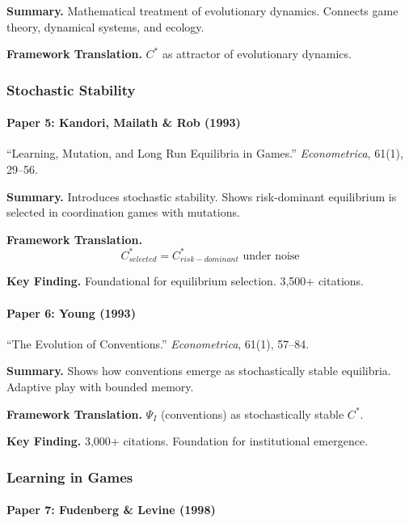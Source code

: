 \textbf{Summary.}
Mathematical treatment of evolutionary dynamics. Connects game theory, 
dynamical systems, and ecology.

\textbf{Framework Translation.}
$C^*$ as attractor of evolutionary dynamics.

\subsubsection{Stochastic Stability}

\paragraph{Paper 5: Kandori, Mailath \& Rob (1993)}

``Learning, Mutation, and Long Run Equilibria in Games.''
\textit{Econometrica}, 61(1), 29--56.

\textbf{Summary.}
Introduces stochastic stability. Shows risk-dominant equilibrium is selected 
in coordination games with mutations.

\textbf{Framework Translation.}
\begin{equation}
C^*_{selected} = C^*_{risk-dominant} \text{ under noise}
\end{equation}

\textbf{Key Finding.}
Foundational for equilibrium selection. 3,500+ citations.

\paragraph{Paper 6: Young (1993)}

``The Evolution of Conventions.''
\textit{Econometrica}, 61(1), 57--84.

\textbf{Summary.}
Shows how conventions emerge as stochastically stable equilibria.
Adaptive play with bounded memory.

\textbf{Framework Translation.}
$\Psi_I$ (conventions) as stochastically stable $C^*$.

\textbf{Key Finding.}
3,000+ citations. Foundation for institutional emergence.

\subsubsection{Learning in Games}

\paragraph{Paper 7: Fudenberg \& Levine (1998)}


